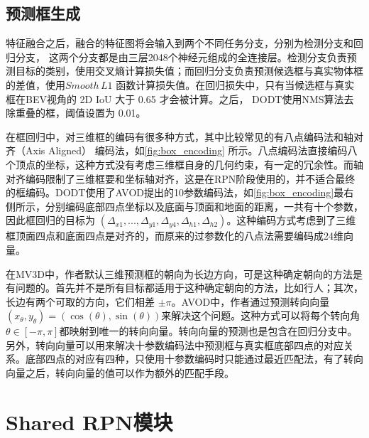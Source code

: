 \subsection{预测框生成}



特征融合之后，融合的特征图将会输入到两个不同任务分支，分别为检测分支和回归分支， 这两个分支都是由三层2048个神经元组成的全连接层。检测分支负责预测目标的类别，使用交叉熵计算损失值；而回归分支负责预测候选框与真实物体框的差值，使用$Smooth \, L1$ 函数计算损失值。在回归损失中，只有当候选框与真实框在BEV视角的 2D IoU 大于 0.65 才会被计算。之后， DODT使用NMS算法去除重叠的框，阈值设置为 0.01。

在框回归中，对三维框的编码有很多种方式，其中比较常见的有八点编码法和轴对齐（Axis Aligned） 编码法，如\figurename \ref{fig:box_encoding} 所示。八点编码法直接编码八个顶点的坐标，这种方式没有考虑三维框自身的几何约束，有一定的冗余性。而轴对齐编码限制了三维框要和坐标轴对齐，这是在RPN阶段使用的，并不适合最终的框编码。DODT使用了AVOD提出的10参数编码法，如\figurename \ref{fig:box_encoding}最右侧所示，分别编码底部四点坐标以及底面与顶面和地面的距离，一共有十个参数，因此框回归的目标为 $(\Delta_{x1}, ...,\Delta_{y1}, \Delta_{y4}, \Delta_{h1}, \Delta_{h2})$。这种编码方式考虑到了三维框顶面四点和底面四点是对齐的，而原来的过参数化的八点法需要编码成24维向量。

在MV3D中，作者默认三维预测框的朝向为长边方向，可是这种确定朝向的方法是有问题的。首先并不是所有目标都适用于这种确定朝向的方法，比如行人；其次，长边有两个可取的方向，它们相差 $\pm \pi$。AVOD中，作者通过预测转向向量 $(x_{\theta},y_{\theta}) = (\cos(\theta), \sin(\theta))$来解决这个问题。这种方式可以将每个转向角$\theta \in [-\pi, \pi]$都映射到唯一的转向向量。转向向量的预测也是包含在回归分支中。另外，转向向量可以用来解决十参数编码法中预测框与真实框底部四点的对应关系。底部四点的对应有四种，只使用十参数编码时只能通过最近匹配法，有了转向向量之后，转向向量的值可以作为额外的匹配手段。


\section{Shared RPN模块}
\label{shared_rpn}



